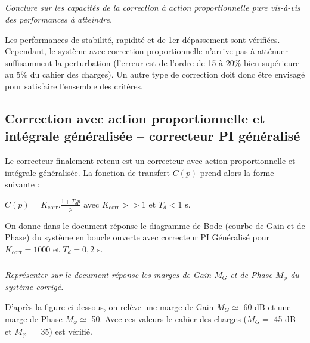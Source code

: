\begin{multicols}{2}
\begin{center}
\end{center}
\fi

\subparagraph{}\textit{Conclure sur les capacités de la correction à action proportionnelle pure vis-à-vis des performances à atteindre.}
\ifprof
\begin{corrige}
Les performances de stabilité, rapidité et de 1er dépassement sont vérifiées. Cependant, le système avec correction proportionnelle n'arrive pas à atténuer suffisamment la perturbation (l'erreur est de l'ordre de 15 à 20$\%$ bien supérieure au 5$\%$ du cahier des charges). Un autre type de correction doit donc être envisagé pour satisfaire l'ensemble des critères.\end{corrige}
\fi


\ifprof
\else
\subsection*{Correction avec action proportionnelle et intégrale généralisée -- correcteur PI généralisé}


Le correcteur finalement retenu est un correcteur avec action proportionnelle et intégrale généralisée. La fonction de transfert $C(p)$ prend alors la forme suivante :

{\centering
$C(p)= K_{\text{corr}} . \frac{1+T_d p}{p}$  avec $K_{\text{corr}} >> 1$ et $T_d < 1$ s.
\par}
On donne dans le document réponse le diagramme de Bode (courbe de Gain et de Phase) du système en boucle ouverte avec correcteur PI Généralisé pour $K_{\text{corr}} = \num{1000}$ et $T_d = 0,2$ s. 
\fi

\subparagraph{}\textit{Représenter sur le document réponse les marges de Gain $M_G$ et de Phase $M_{\phi}$ du système corrigé.\label{Q:Bode_corrige}}

\ifprof
\begin{corrige}
D'après la figure ci-dessous, on relève une marge de Gain $M_G \simeq$ 60 dB et une marge de Phase $M_{\varphi} \simeq$ 50\degre. Avec ces valeurs le cahier des charges ($M_G =$ 45 dB et $M_{\varphi} =$ 35\degre) est vérifié.
 

\end{corrige}
\end{multicols}
